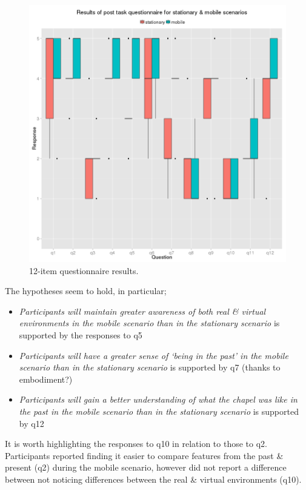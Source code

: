 \begin{figure}[h]
	\begin{center}
		\includegraphics[width=0.9\linewidth]{images/post_task_questionnaire_boxplot.png}
		\caption{12-item questionnaire results.}
		\label{12-item_boxplot}
	\end{center}
\end{figure}

The hypotheses seem to hold, in particular;

\begin{itemize}
	\item \textit{Participants will maintain greater awareness of both real \& virtual environments in the mobile scenario than in the stationary scenario} is supported by the responses to q5
	\item \textit{Participants will have a greater sense of `being in the past' in the mobile scenario than in the stationary scenario} is supported by q7 (thanks to embodiment?)
	\item \textit{Participants will gain a better understanding of what the chapel was like in the past in the mobile scenario than in the stationary scenario} is supported by q12
\end{itemize}

It is worth highlighting the responses to q10 in relation to those to q2. Participants reported finding it easier to compare features from the past \& present (q2) during the mobile scenario, however did not report a difference between not noticing differences between the real \& virtual environments (q10).

